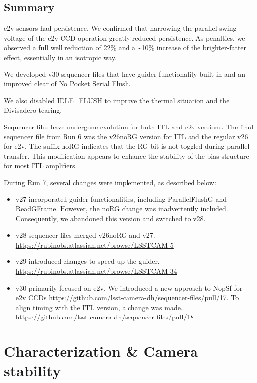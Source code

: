 \subsection{Summary}\label{summary}
e2v sensors had persistence. We confirmed that narrowing the parallel swing voltage of the e2v CCD operation greatly reduced persistence. As penalties, we observed a full well reduction of 22\% and a \textasciitilde10\% increase of the
brighter-fatter effect, essentially in an isotropic way.

We developed v30 sequencer files that have guider functionality built in and an improved clear of No Pocket Serial Flush.

We also disabled IDLE\_FLUSH to improve the thermal situation and the Divisadero tearing.

Sequencer files have undergone evolution for both ITL and e2v versions.
The final sequencer file from Run 6 was the
v26noRG version for ITL and the regular v26
for e2v. The suffix noRG indicates that the
RG bit is not toggled during parallel transfer. This modification
appears to enhance the stability of the bias structure for most ITL
amplifiers.

During Run 7, several changes were implemented, as described below:

\begin{itemize}
\tightlist
\item
  v27 incorporated guider functionalities, including ParallelFlushG and
  ReadGFrame. However, the noRG change was inadvertently included.
  Consequently, we abandoned this version and switched to v28.
\item
  v28 sequencer files merged v26noRG and
  v27. \url{https://rubinobs.atlassian.net/browse/LSSTCAM-5}
\item
  v29 introduced changes to speed up the guider.
  \url{https://rubinobs.atlassian.net/browse/LSSTCAM-34}
\item
  v30 primarily focused on e2v. We introduced a new approach to NopSf
  for e2v CCDs
  \url{https://github.com/lsst-camera-dh/sequencer-files/pull/17}. To
  align timing with the ITL version, a change was made.
  \url{https://github.com/lsst-camera-dh/sequencer-files/pull/18}
\end{itemize}


\section{Characterization \& Camera
stability}\label{characterization-camera-stability}

